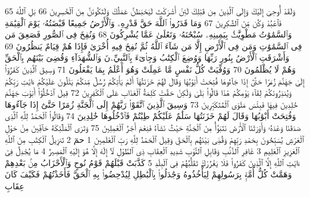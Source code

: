{\tiny\colorbox{cl_aya}{65}} وَلَقَدْ أُوحِىَ إِلَيْكَ وَإِلَى ٱلَّذِينَ مِن قَبْلِكَ لَئِنْ أَشْرَكْتَ لَيَحْبَطَنَّ عَمَلُكَ وَلَتَكُونَنَّ مِنَ ٱلْخَٰسِرِينَ
{\tiny\colorbox{cl_aya}{66}} بَلِ ٱللَّهَ فَٱعْبُدْ وَكُن مِّنَ ٱلشَّٰكِرِينَ
{\tiny\colorbox{cl_aya}{67}} وَمَا قَدَرُوا۟ ٱللَّهَ حَقَّ قَدْرِهِۦ وَٱلْأَرْضُ جَمِيعًا قَبْضَتُهُۥ يَوْمَ ٱلْقِيَٰمَةِ وَٱلسَّمَٰوَٰتُ مَطْوِيَّٰتٌۢ بِيَمِينِهِۦ سُبْحَٰنَهُۥ وَتَعَٰلَىٰ عَمَّا يُشْرِكُونَ
{\tiny\colorbox{cl_aya}{68}} وَنُفِخَ فِى ٱلصُّورِ فَصَعِقَ مَن فِى ٱلسَّمَٰوَٰتِ وَمَن فِى ٱلْأَرْضِ إِلَّا مَن شَآءَ ٱللَّهُ ثُمَّ نُفِخَ فِيهِ أُخْرَىٰ فَإِذَا هُمْ قِيَامٌ يَنظُرُونَ
{\tiny\colorbox{cl_aya}{69}} وَأَشْرَقَتِ ٱلْأَرْضُ بِنُورِ رَبِّهَا وَوُضِعَ ٱلْكِتَٰبُ وَجِا۟ىٓءَ بِٱلنَّبِيِّۦنَ وَٱلشُّهَدَآءِ وَقُضِىَ بَيْنَهُم بِٱلْحَقِّ وَهُمْ لَا يُظْلَمُونَ
{\tiny\colorbox{cl_aya}{70}} وَوُفِّيَتْ كُلُّ نَفْسٍ مَّا عَمِلَتْ وَهُوَ أَعْلَمُ بِمَا يَفْعَلُونَ
{\tiny\colorbox{cl_aya}{71}} وَسِيقَ ٱلَّذِينَ كَفَرُوٓا۟ إِلَىٰ جَهَنَّمَ زُمَرًا حَتَّىٰٓ إِذَا جَآءُوهَا فُتِحَتْ أَبْوَٰبُهَا وَقَالَ لَهُمْ خَزَنَتُهَآ أَلَمْ يَأْتِكُمْ رُسُلٌ مِّنكُمْ يَتْلُونَ عَلَيْكُمْ ءَايَٰتِ رَبِّكُمْ وَيُنذِرُونَكُمْ لِقَآءَ يَوْمِكُمْ هَٰذَا قَالُوا۟ بَلَىٰ وَلَٰكِنْ حَقَّتْ كَلِمَةُ ٱلْعَذَابِ عَلَى ٱلْكَٰفِرِينَ
{\tiny\colorbox{cl_aya}{72}} قِيلَ ٱدْخُلُوٓا۟ أَبْوَٰبَ جَهَنَّمَ خَٰلِدِينَ فِيهَا فَبِئْسَ مَثْوَى ٱلْمُتَكَبِّرِينَ
{\tiny\colorbox{cl_aya}{73}} وَسِيقَ ٱلَّذِينَ ٱتَّقَوْا۟ رَبَّهُمْ إِلَى ٱلْجَنَّةِ زُمَرًا حَتَّىٰٓ إِذَا جَآءُوهَا وَفُتِحَتْ أَبْوَٰبُهَا وَقَالَ لَهُمْ خَزَنَتُهَا سَلَٰمٌ عَلَيْكُمْ طِبْتُمْ فَٱدْخُلُوهَا خَٰلِدِينَ
{\tiny\colorbox{cl_aya}{74}} وَقَالُوا۟ ٱلْحَمْدُ لِلَّهِ ٱلَّذِى صَدَقَنَا وَعْدَهُۥ وَأَوْرَثَنَا ٱلْأَرْضَ نَتَبَوَّأُ مِنَ ٱلْجَنَّةِ حَيْثُ نَشَآءُ فَنِعْمَ أَجْرُ ٱلْعَٰمِلِينَ
{\tiny\colorbox{cl_aya}{75}} وَتَرَى ٱلْمَلَٰٓئِكَةَ حَآفِّينَ مِنْ حَوْلِ ٱلْعَرْشِ يُسَبِّحُونَ بِحَمْدِ رَبِّهِمْ وَقُضِىَ بَيْنَهُم بِٱلْحَقِّ وَقِيلَ ٱلْحَمْدُ لِلَّهِ رَبِّ ٱلْعَٰلَمِينَ
{\tiny\colorbox{cl_aya}{1}} حمٓ
{\tiny\colorbox{cl_aya}{2}} تَنزِيلُ ٱلْكِتَٰبِ مِنَ ٱللَّهِ ٱلْعَزِيزِ ٱلْعَلِيمِ
{\tiny\colorbox{cl_aya}{3}} غَافِرِ ٱلذَّنۢبِ وَقَابِلِ ٱلتَّوْبِ شَدِيدِ ٱلْعِقَابِ ذِى ٱلطَّوْلِ لَآ إِلَٰهَ إِلَّا هُوَ إِلَيْهِ ٱلْمَصِيرُ
{\tiny\colorbox{cl_aya}{4}} مَا يُجَٰدِلُ فِىٓ ءَايَٰتِ ٱللَّهِ إِلَّا ٱلَّذِينَ كَفَرُوا۟ فَلَا يَغْرُرْكَ تَقَلُّبُهُمْ فِى ٱلْبِلَٰدِ
{\tiny\colorbox{cl_aya}{5}} كَذَّبَتْ قَبْلَهُمْ قَوْمُ نُوحٍ وَٱلْأَحْزَابُ مِنۢ بَعْدِهِمْ وَهَمَّتْ كُلُّ أُمَّةٍۭ بِرَسُولِهِمْ لِيَأْخُذُوهُ وَجَٰدَلُوا۟ بِٱلْبَٰطِلِ لِيُدْحِضُوا۟ بِهِ ٱلْحَقَّ فَأَخَذْتُهُمْ فَكَيْفَ كَانَ عِقَابِ
